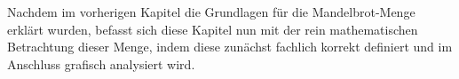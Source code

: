 
Nachdem im vorherigen Kapitel die Grundlagen für die Mandelbrot-Menge
erklärt wurden, befasst sich diese Kapitel nun mit der rein mathematischen Betrachtung
dieser Menge, indem diese zunächst fachlich korrekt definiert und
im Anschluss grafisch analysiert wird.

